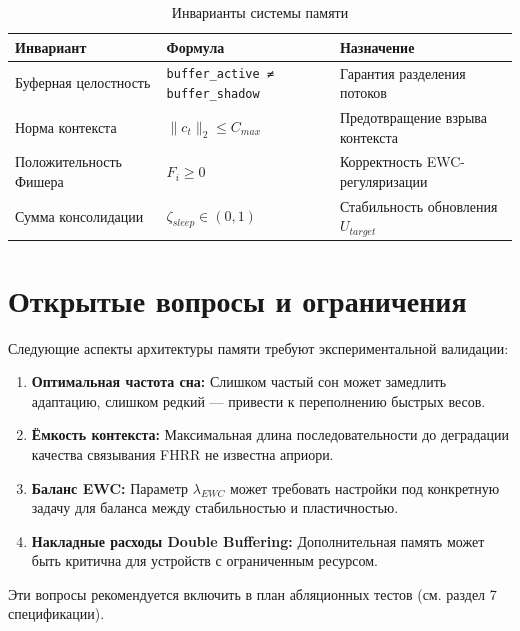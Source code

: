 \begin{table}[h]
\centering
\caption{Инварианты системы памяти}
\label{tab:memory_invariants}
\begin{tabular}{lp{6cm}p{4cm}}
\toprule
\textbf{Инвариант} & \textbf{Формула} & \textbf{Назначение} \\
\midrule
Буферная целостность & \texttt{buffer\_active ≠ buffer\_shadow} & Гарантия разделения потоков \\
Норма контекста & $\|c_t\|_2 \leq C_{max}$ & Предотвращение взрыва контекста \\
Положительность Фишера & $F_i \geq 0$ & Корректность EWC-регуляризации \\
Сумма консолидации & $\zeta_{sleep} \in (0, 1)$ & Стабильность обновления $U_{target}$ \\
\bottomrule
\end{tabular}
\end{table}

\section{Открытые вопросы и ограничения}

Следующие аспекты архитектуры памяти требуют экспериментальной валидации:

\begin{enumerate}
    \item \textbf{Оптимальная частота сна:} Слишком частый сон может замедлить адаптацию, слишком редкий — привести к переполнению быстрых весов.
    
    \item \textbf{Ёмкость контекста:} Максимальная длина последовательности до деградации качества связывания FHRR не известна априори.
    
    \item \textbf{Баланс EWC:} Параметр $\lambda_{EWC}$ может требовать настройки под конкретную задачу для баланса между стабильностью и пластичностью.
    
    \item \textbf{Накладные расходы Double Buffering:} Дополнительная память может быть критична для устройств с ограниченным ресурсом.
\end{enumerate}

Эти вопросы рекомендуется включить в план абляционных тестов (см. раздел 7 спецификации).
